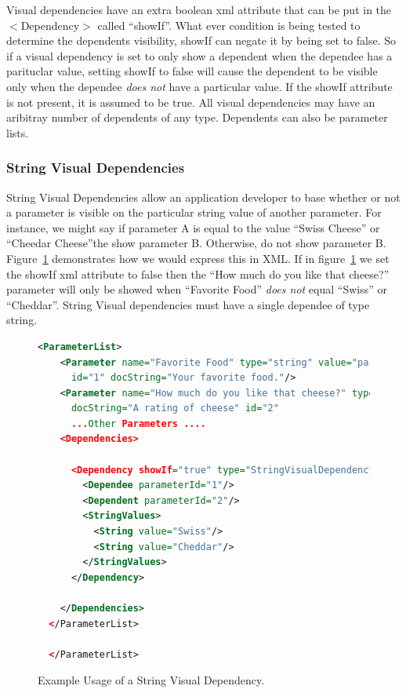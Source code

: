 Visual dependencies have an extra boolean xml attribute that can be put in the $<$Dependency$>$ called ``showIf''. What ever condition is being tested to 
determine the dependents visibility, showIf can negate it by being set to false. So if a visual dependency is set to only show a dependent when the
dependee has a parituclar value, setting showIf to false will cause the dependent to be visible only when the dependee \emph{does not} have a particular
value. If the showIf attribute is not present, it is assumed to be true. All visual dependencies may have an aribitray number of dependents of any type.
Dependents can also be parameter lists.

\subsubsection{String Visual Dependencies}
String Visual Dependencies allow an application developer to base whether or not a parameter is visible on the particular string value of another
parameter. For instance, we might say if parameter A is equal to the value ``Swiss Cheese'' or ``Cheedar Cheese''the show parameter B. Otherwise, do not 
show parameter B. Figure~\ref{StringVisXML} demonstrates how we would express this in XML.  If in figure~\ref{StringVisXML} we set the showIf xml attribute to false then the ``How much do you like that cheese?'' parameter will only be showed when ``Favorite Food'' \emph{does not} equal ``Swiss'' or ``Cheddar''.
String Visual dependencies must have a single dependee of type string. 
\begin{figure}
  \centering
  \begin{lstlisting}[language=XML]
  <ParameterList>
    <Parameter name="Favorite Food" type="string" value="pasta"
      id="1" docString="Your favorite food."/>
    <Parameter name="How much do you like that cheese?" type="int" value="5"
      docString="A rating of cheese" id="2"
      ...Other Parameters ....
    <Dependencies>

      <Dependency showIf="true" type="StringVisualDependency">
        <Dependee parameterId="1"/>
        <Dependent parameterId="2"/>
        <StringValues>
          <String value="Swiss"/>
          <String value="Cheddar"/>
        </StringValues>
      </Dependency>

    </Dependencies>
  </ParameterList>
        
  </ParameterList>
  \end{lstlisting}
  \caption{Example Usage of a String Visual Dependency.}
  \label{StringVisXML}
\end{figure}

